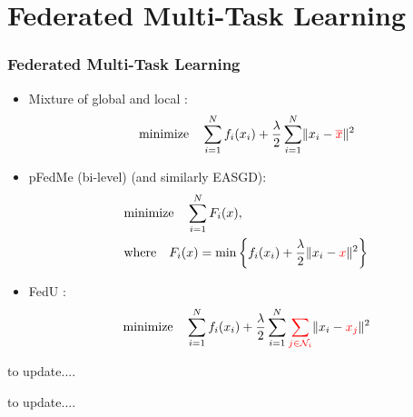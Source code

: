 
\section[FMTL]{Federated Multi-Task Learning}


\begin{frame}
\frametitle{Federated Multi-Task Learning}

\begin{itemize}
    \item Mixture of global and local \cite{hanzely2020federated}:
    $$\text{minimize} \quad \sum\limits_{i=1}^N f_i(x_i) + \dfrac{\lambda}{2} \sum\limits_{i=1}^N \lVert x_i - {\color{red} \overline{x}} \rVert^2$$
    \item pFedMe (bi-level) \cite{t2020pfedme} (and similarly EASGD\cite{zhang2015easgd}):
    \begin{align*}
        & \text{minimize} \quad \sum\limits_{i=1}^N F_i(x), \\
        & \text{where} \quad F_i(x) = \min \left\{ f_i(x_i) + \dfrac{\lambda}{2} \lVert x_i - {\color{red} x}\rVert^2 \right\}
    \end{align*}
    \item FedU \cite{dinh2021fedu}:
    $$\text{minimize} \quad \sum\limits_{i=1}^N f_i(x_i) + \dfrac{\lambda}{2} \sum\limits_{i=1}^N {\color{red} \sum\limits_{j\in\mathcal{N}_i}} \lVert x_i - {\color{red} x_j} \rVert^2$$
\end{itemize}

\end{frame}


\begin{frame}

to update....

\end{frame}


\begin{frame}

to update....

\end{frame}


